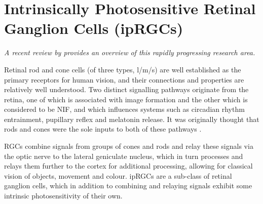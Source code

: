 \section{Intrinsically Photosensitive Retinal Ganglion Cells (ipRGCs)}

\textit{A recent review by \citet{spitschan_melanopsin_2019} provides an overview of this rapidly progressing research area.}

\bigskip

Retinal rod and cone cells (of three types, l/m/s) are well established as the primary receptors for human vision, and their connections and properties are relatively well understood. Two distinct signalling pathways originate from the retina, one of which is associated with image formation and the other which is considered to be \gls{NIF}, and which influences systems such as circadian rhythm entrainment, pupillary reflex and melatonin release. It was originally thought that rods and cones were the sole inputs to both of these pathways \citep{hankins_melanopsin_2008}.

\Glspl{RGC} combine signals from groups of cones and rods and relay these signals via the optic nerve to the lateral geniculate nucleus, which in turn processes and relays them further to the cortex for additional processing, allowing for classical vision of objects, movement and colour. \Glspl{ipRGC} are a sub-class of retinal ganglion cells, which in addition to combining and relaying signals exhibit some intrinsic photosensitivity of their own. 

